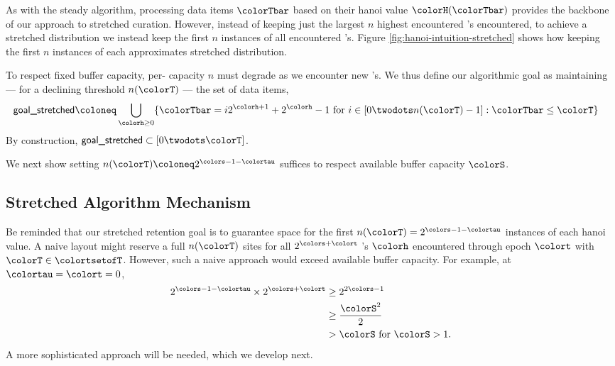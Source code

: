 

As with the steady algorithm, processing data items $\colorTbar$ based on their hanoi value $\colorH(\colorTbar)$ provides the backbone of our approach to stretched curation.
However, instead of keeping just the largest $n$ highest encountered \hv{}'s encountered, to achieve a stretched distribution we instead keep the first $n$ instances of all encountered \hv{}'s.
Figure \ref{fig:hanoi-intuition-stretched} shows how keeping the first $n$ instances of each \hv{} approximates stretched distribution.

To respect fixed buffer capacity, per-\hv{} capacity $n$ must degrade as we encounter new \hv{}'s.
We thus define our algorithmic goal as maintaining --- for a declining threshold $n(\colorT)$ --- the set of data items,
\begin{align*}
\textsf{goal\_stretched}
&\coloneq
\bigcup_{\colorh \geq 0}
\{ \colorTbar = i2^{\colorh + 1} + 2^{\colorh} - 1 \text{ for } i \in [0 \twodots n(\colorT) - 1] : \colorTbar \leq \colorT \}
\end{align*}
By construction, $\textsf{goal\_stretched} \subset [0 \twodots \colorT]$.

We next show setting $n(\colorT) \coloneq 2^{\colors - 1 - \colortau}$ suffices to respect available buffer capacity $\colorS$.





\subsection{Stretched Algorithm Mechanism}
\label{sec:stretched-mechanism}



Be reminded that our stretched retention goal is to guarantee space for the first $n(\colorT) =  2^{\colors - 1 - \colortau}$ instances of each hanoi value.
A naive layout might reserve a full $n(\colorT)$ sites for all $2^{\colors + \colort}$ \hv{}'s $\colorh$ encountered through epoch $\colort$ with $\colorT \in \colortsetofT$.
However, such a naive approach would exceed available buffer capacity.
For example, at $\colortau=\colort=0$,
\begin{align*}
2^{\colors - 1 - \colortau} \times 2^{\colors + \colort}
&\geq
2^{2\colors - 1}\\
&\geq
\frac{\colorS^{2}}{2}\\
&> \colorS \text{ for } \colorS > 1.
\end{align*}
A more sophisticated approach will be needed, which we develop next.

